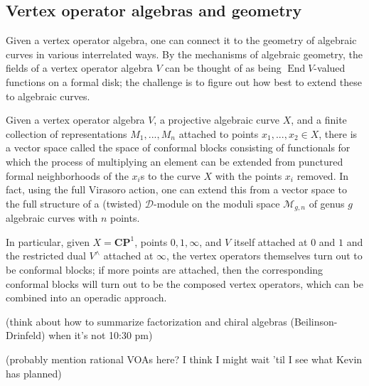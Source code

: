 \documentclass{article}
\newcommand{\CP}{\mathbold{CP}}
\newcommand{\Dd}{\mathcal{D}}
\DeclareMathOperator{\End}{End}
\begin{document}
\subsection{Vertex operator algebras and geometry}
Given a vertex operator algebra, one can connect it to the geometry of algebraic curves in various interrelated ways.  By the mechanisms of algebraic geometry, the fields of a vertex operator algebra $V$ can be thought of as being $\End V$-valued functions on a formal disk; the challenge is to figure out how best to extend these to algebraic curves.

Given a vertex operator algebra $V$, a projective algebraic curve $X$, and a finite collection of representations $M_1,...,M_n$ attached to points $x_1,...,x_2 \in X$, there is a vector space called the space of conformal blocks consisting of functionals for which the process of multiplying an element can be extended from punctured formal neighborhoods of the $x_i$s to the curve $X$ with the points $x_i$ removed.  In fact, using the full Virasoro action, one can extend this from a vector space to the full structure of a (twisted) $\Dd$-module on the moduli space $\mathcal{M}_{g,n}$ of genus $g$ algebraic curves with $n$ points.

In particular, given $X=\CP^1$, points $0,1,\infty$, and $V$ itself attached at $0$ and $1$ and the restricted dual $V^\wedge$ attached at $\infty$, the vertex operators themselves turn out to be conformal blocks; if more points are attached, then the corresponding conformal blocks will turn out to be the composed vertex operators, which can be combined into an operadic approach.

(think about how to summarize factorization and chiral algebras (Beilinson-Drinfeld) when it's not 10:30 pm)

(probably mention rational VOAs here?  I think I might wait 'til I see what Kevin has planned)
\end{document}
